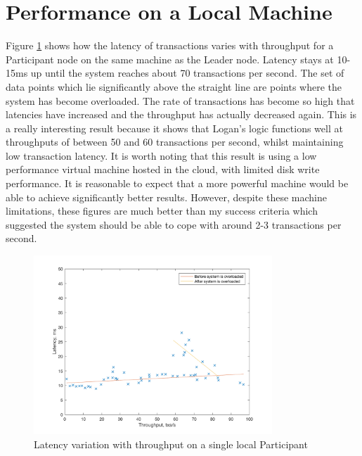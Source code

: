 \documentclass[12pt,a4paper,twoside,openright]{report}
\begin{document}
	\section{Performance on a Local Machine}
	Figure \ref{fig:singlocal} shows how the latency of transactions varies with throughput for a Participant node on the same machine as the Leader node.
	Latency stays at 10-15ms up until the system reaches about 70 transactions per second.
	The set of data points which lie significantly above the straight line are points where the system has become overloaded. 
	The rate of transactions has become so high that latencies have increased and the throughput has actually decreased again. 
	This is a really interesting result because it shows that Logan's logic functions well at throughputs of between 50 and 60 transactions per second, whilst maintaining low transaction latency.
	It is worth noting that this result is using a low performance virtual machine hosted in the cloud, with limited disk write performance. 
	It is reasonable to expect that a more powerful machine would be able to achieve significantly better results.
	However, despite these machine limitations, these figures are much better than my success criteria which suggested the system should be able to cope with around 2-3 transactions per second.\\
	\begin{figure}
		\centering
		\includegraphics[width=0.8\textwidth]{figs/single_local_worker.png}
		\caption{Latency variation with throughput on a single local Participant}
		\label{fig:singlocal}
	\end{figure}
\end{document}
